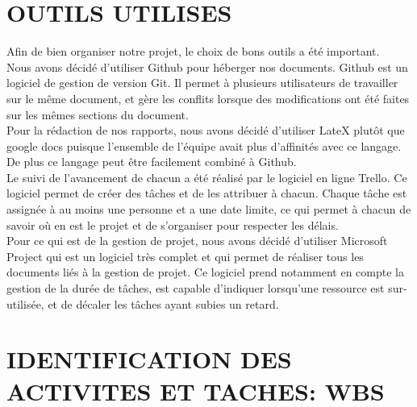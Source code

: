 \documentclass[]{scrartcl}
\begin{document}
\begin{itemize}
\section{OUTILS UTILISES}
Afin de bien organiser notre projet, le choix de bons outils a été important. \\
Nous avons décidé d'utiliser Github pour héberger nos documents. Github est un logiciel de gestion de version Git. Il permet à plusieurs utilisateurs de travailler sur le même document, et gère les conflits lorsque des modifications ont été faites sur les mêmes sections du document. \\
Pour la rédaction de nos rapports, nous avons décidé d'utiliser LateX plutôt que google docs puisque l'ensemble de l'équipe avait plus d'affinités avec ce langage. De plus ce langage peut être facilement combiné à Github. \\
Le suivi de l'avancement de chacun a été réalisé par le logiciel en ligne Trello. Ce logiciel permet de créer des tâches et de les attribuer à chacun. Chaque tâche est assignée à au moins une personne et a une date limite, ce qui permet à chacun de savoir où en est le projet et de s'organiser pour respecter les délais. \\

Pour ce qui est de la gestion de projet, nous avons décidé d'utiliser Microsoft Project qui est un logiciel très complet et qui permet de réaliser tous les documents liés à la gestion de projet. Ce logiciel prend notamment en compte la gestion de la durée de tâches, est capable d'indiquer lorsqu'une ressource est sur-utilisée, et de décaler les tâches ayant subies un retard. 

\section{IDENTIFICATION DES ACTIVITES ET TACHES: WBS}

\end{itemize}
\end{document}
